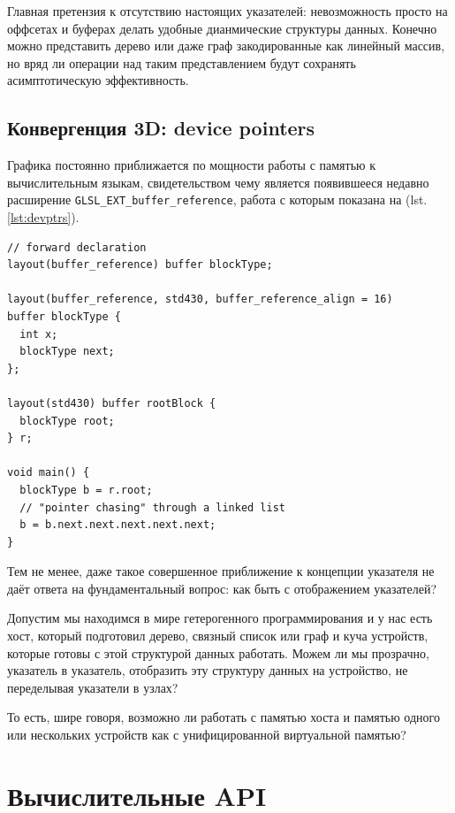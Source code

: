 \documentclass[a4paper,12pt,oneside]{article}
\begin{document}
Главная претензия к отсутствию настоящих указателей: невозможность просто на оффсетах и буферах делать удобные дианмические структуры данных.
Конечно можно представить дерево или даже граф закодированные как линейный массив, но вряд ли операции над таким представлением будут сохранять асимптотическую эффективность.

\subsection{Конвергенция 3D: device pointers}\label{subsec:devpointers}

Графика постоянно приближается по мощности работы с памятью к вычислительным языкам, свидетельством чему является появившееся недавно расширение \lstinline!GLSL_EXT_buffer_reference!, работа с которым показана на (lst. \ref{lst:devptrs}).

\begin{lstlisting}[caption={Работа с device pointers на GLSL},label={lst:devptrs}]
// forward declaration
layout(buffer_reference) buffer blockType;

layout(buffer_reference, std430, buffer_reference_align = 16) 
buffer blockType {
  int x;
  blockType next;
};

layout(std430) buffer rootBlock {
  blockType root;
} r;

void main() {
  blockType b = r.root;
  // "pointer chasing" through a linked list
  b = b.next.next.next.next.next;
}
\end{lstlisting}

Тем не менее, даже такое совершенное приближение к концепции указателя не даёт ответа на фундаментальный вопрос: как быть с отображением указателей? 

Допустим мы находимся в мире гетерогенного программирования и у нас есть хост, который подготовил дерево, связный список или граф и куча устройств, которые готовы с этой структурой данных работать.
Можем ли мы прозрачно, указатель в указатель, отобразить эту структуру данных на устройство, не переделывая указатели в узлах?

То есть, шире говоря, возможно ли работать с памятью хоста и памятью одного или нескольких устройств как с унифицированной виртуальной памятью?

\pagebreak
\section{Вычислительные API}\label{sec:SingleSource}
\end{document}
